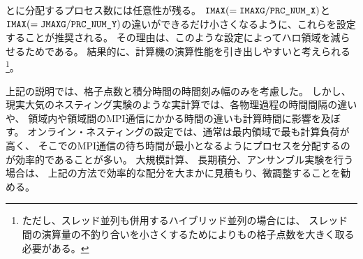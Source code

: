 {\XDIR} と{\YDIR}に分配するプロセス数には任意性が残る。
$\nmitemeq{IMAX}(=\nmitemeq{IMAXG}/\nmitemeq{PRC_NUM_X})$と$\nmitemeq{IMAX}(=\nmitemeq{JMAXG}/\nmitemeq{PRC_NUM_Y})$の違いができるだけ小さくなるように、これらを設定することが推奨される。
その理由は、このような設定によってハロ領域を減らせるためである。
結果的に、計算機の演算性能を引き出しやすいと考えられる
\footnote{ただし、スレッド並列も併用するハイブリッド並列の場合には、
スレッド間の演算量の不釣り合いを小さくするために{\XDIR}よりも{\YDIR}の格子点数を大きく取る必要がある。}。


上記の説明では、格子点数と積分時間の時間刻み幅のみを考慮した。
しかし、現実大気のネスティング実験のような実計算では、各物理過程の時間間隔の違いや、
領域内や領域間のMPI通信にかかる時間の違いも計算時間に影響を及ぼす。
オンライン・ネスティングの設定では、通常は最内領域で最も計算負荷が高く、
そこでのMPI通信の待ち時間が最小となるようにプロセスを分配するのが効率的であることが多い。
大規模計算、 長期積分、アンサンブル実験を行う場合は、
上記の方法で効率的な配分を大まかに見積もり、微調整することを勧める。
